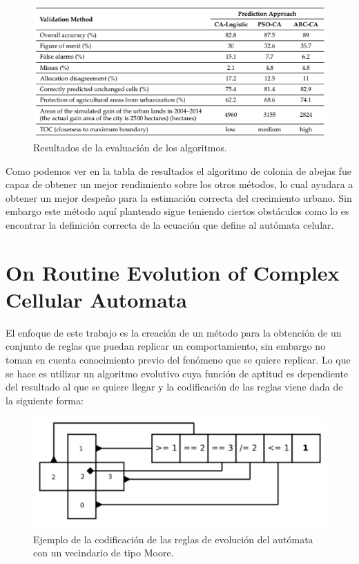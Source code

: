 \begin{figure}[H]
	\centering
	\includegraphics[width=\linewidth]{fig/results}
	\caption{Resultados de la evaluación de los algoritmos. }
	\label{fig:results}
\end{figure}

Como podemos ver en la tabla de resultados el algoritmo de colonia de abejas fue capaz de obtener un mejor rendimiento sobre los otros métodos, lo cual ayudara a obtener un mejor despeño para la estimación correcta del crecimiento urbano. Sin embargo este método aquí planteado sigue teniendo ciertos obstáculos como lo es encontrar la definición correcta de la ecuación que define al autómata celular.

\section{On Routine Evolution of Complex Cellular Automata}

El enfoque de este trabajo \citep{bidlo2016routine} es la creación de un método para la obtención de un conjunto de reglas que puedan replicar un comportamiento, sin embargo no toman en cuenta conocimiento previo del fenómeno que se quiere replicar. Lo que se hace es utilizar un algoritmo evolutivo cuya función de aptitud es dependiente del resultado al que se quiere llegar y la codificación de las reglas viene dada de la siguiente forma:

\begin{figure}[H]
	\centering
	\includegraphics[width=\linewidth]{fig/rulesencoding}
	\caption{Ejemplo de la codificación de las reglas de evolución del autómata con un vecindario de tipo Moore.}
	\label{fig:rulesencoding}
\end{figure}
